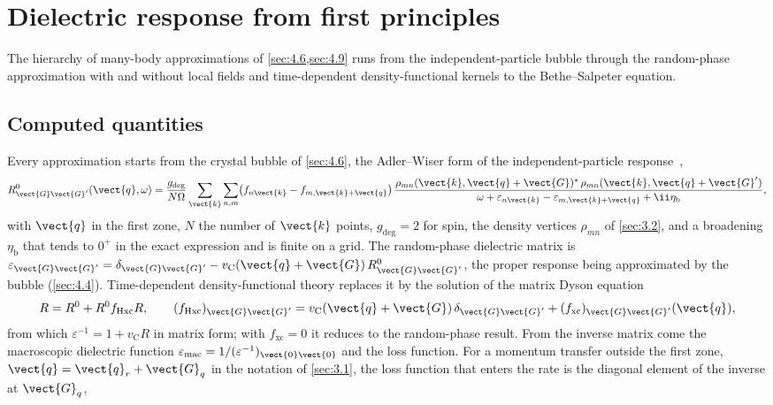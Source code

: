 \section{Dielectric response from first principles}\label{app:E.6}

The hierarchy of many-body approximations of \cref{sec:4.6,sec:4.9} runs from the independent-particle bubble through the random-phase approximation with and without local fields and time-dependent density-functional kernels to the Bethe--Salpeter equation.

\subsection{Computed quantities}

Every approximation starts from the crystal bubble of \cref{sec:4.6}, the Adler--Wiser form of the independent-particle response~\cite{adler1962quantum,wiser1963dielectric},
\begin{equation}
  R^0_{\vect{G}\vect{G}'}(\vect{q},\omega) = \frac{g_{\mathrm{deg}}}{N\Omega}\sum_{\vect{k}}\sum_{n,m}
  \bigl(f_{n\vect{k}} - f_{m,\vect{k}+\vect{q}}\bigr)\,
  \frac{\rho_{mn}(\vect{k},\vect{q}+\vect{G})^*\,\rho_{mn}(\vect{k},\vect{q}+\vect{G}')}{\omega + \varepsilon_{n\vect{k}} - \varepsilon_{m,\vect{k}+\vect{q}} + \ii\eta_{\mathrm{b}}} ,
  \label{eq:E.6-R0}
\end{equation}
with $\vect{q}$ in the first zone, $N$ the number of $\vect{k}$ points, $g_{\mathrm{deg}} = 2$ for spin, the density vertices $\rho_{mn}$ of \cref{sec:3.2}, and a broadening $\eta_{\mathrm{b}}$ that tends to $0^+$ in the exact expression and is finite on a grid. The random-phase dielectric matrix is $\varepsilon_{\vect{G}\vect{G}'} = \delta_{\vect{G}\vect{G}'} - v_{\mathrm{C}}(\vect{q}+\vect{G})\,R^0_{\vect{G}\vect{G}'}$, the proper response being approximated by the bubble (\cref{sec:4.4}). Time-dependent density-functional theory replaces it by the solution of the matrix Dyson equation
\begin{equation}
  R = R^0 + R^0 f_{\mathrm{Hxc}} R , \qquad (f_{\mathrm{Hxc}})_{\vect{G}\vect{G}'} = v_{\mathrm{C}}(\vect{q}+\vect{G})\,\delta_{\vect{G}\vect{G}'} + (f_{\mathrm{xc}})_{\vect{G}\vect{G}'}(\vect{q}),
  \label{eq:E.6-dyson}
\end{equation}
from which $\varepsilon^{-1} = 1 + v_{\mathrm{C}}R$ in matrix form; with $f_{\mathrm{xc}} = 0$ it reduces to the random-phase result. From the inverse matrix come the macroscopic dielectric function $\varepsilon_{\mathrm{mac}} = 1/(\varepsilon^{-1})_{\vect{0}\vect{0}}$ and the loss function. For a momentum transfer outside the first zone, $\vect{q} = \vect{q}_r + \vect{G}_q$ in the notation of \cref{sec:3.1}, the loss function that enters the rate is the diagonal element of the inverse at $\vect{G}_q$,
